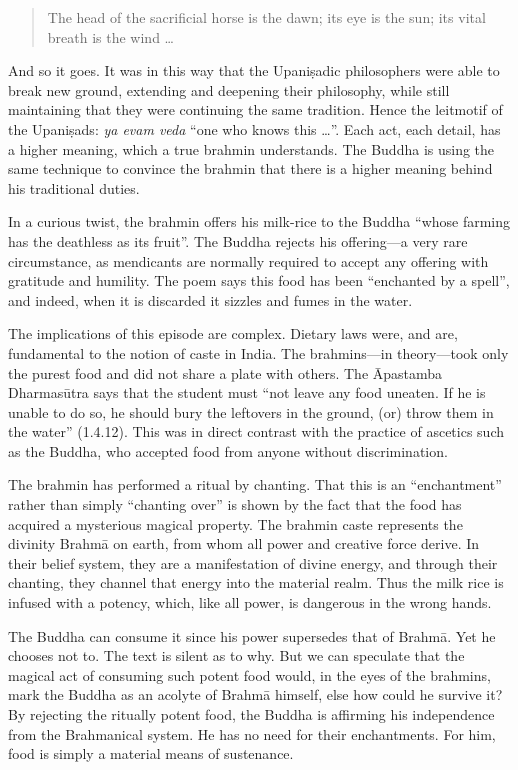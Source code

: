 \documentclass[12pt,openany]{book}%
\begin{document}
\begin{quotation}%
The head of the sacrificial horse is the dawn; its eye is the sun; its vital breath is the wind …

%
\end{quotation}

And so it goes. It was in this way that the \textsanskrit{Upaniṣadic} philosophers were able to break new ground, extending and deepening their philosophy, while still maintaining that they were continuing the same tradition. Hence the leitmotif of the \textsanskrit{Upaniṣads}: \textit{ya evam veda} “one who knows this …”. Each act, each detail, has a higher meaning, which a true brahmin understands. The Buddha is using the same technique to convince the brahmin that there is a higher meaning behind his traditional duties.

In a curious twist, the brahmin offers his milk-rice to the Buddha “whose farming has the deathless as its fruit”. The Buddha rejects his offering—a very rare circumstance, as mendicants are normally required to accept any offering with gratitude and humility. The poem says this food has been “enchanted by a spell”, and indeed, when it is discarded it sizzles and fumes in the water.

The implications of this episode are complex. Dietary laws were, and are, fundamental to the notion of caste in India. The brahmins—in theory—took only the purest food and did not share a plate with others. The Āpastamba \textsanskrit{Dharmasūtra} says that the student must “not leave any food uneaten. If he is unable to do so, he should bury the leftovers in the ground, (or) throw them in the water” (1.4.12). This was in direct contrast with the practice of ascetics such as the Buddha, who accepted food from anyone without discrimination.

The brahmin has performed a ritual by chanting. That this is an “enchantment” rather than simply “chanting over” is shown by the fact that the food has acquired a mysterious magical property. The brahmin caste represents the divinity \textsanskrit{Brahmā} on earth, from whom all power and creative force derive. In their belief system, they are a manifestation of divine energy, and through their chanting, they channel that energy into the material realm. Thus the milk rice is infused with a potency, which, like all power, is dangerous in the wrong hands.

The Buddha can consume it since his power supersedes that of \textsanskrit{Brahmā}. Yet he chooses not to. The text is silent as to why. But we can speculate that the magical act of consuming such potent food would, in the eyes of the brahmins, mark the Buddha as an acolyte of \textsanskrit{Brahmā} himself, else how could he survive it? By rejecting the ritually potent food, the Buddha is affirming his independence from the Brahmanical system. He has no need for their enchantments. For him, food is simply a material means of sustenance.
\end{document}
